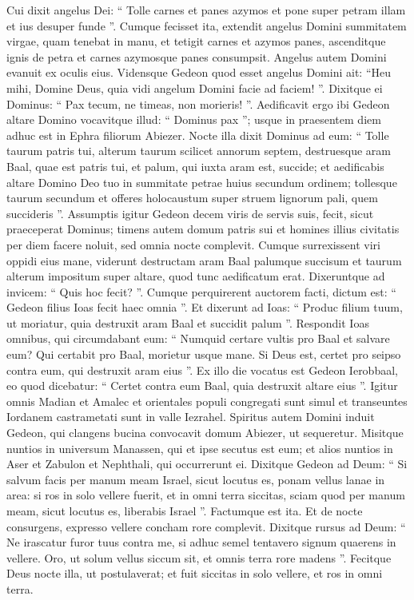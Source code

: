 \begin{biblechapter}
\begin{biblechapter}
\begin{biblechapter}
\begin{biblechapter}
\begin{biblechapter}
\begin{biblechapter}
\verse Cui dixit angelus Dei: “ Tolle carnes et panes azymos et pone super petram illam et ius desuper funde ”. Cumque fecisset ita, 
\verse extendit angelus Domini summitatem virgae, quam tenebat in manu, et tetigit carnes et azymos panes, ascenditque ignis de petra et carnes azymosque panes consumpsit. Angelus autem Domini evanuit ex oculis eius. 
\verse Vidensque Gedeon quod esset angelus Domini ait: “Heu mihi, Domine Deus, quia vidi angelum Domini facie ad faciem! ”. 
\verse Dixitque ei Dominus: “ Pax tecum, ne timeas, non morieris! ”. 
\verse Aedificavit ergo ibi Gedeon altare Domino vocavitque illud: “ Dominus pax ”; usque in praesentem diem adhuc est in Ephra filiorum Abiezer.
 \verse Nocte illa dixit Dominus ad eum: “ Tolle taurum patris tui, alterum taurum scilicet annorum septem, destruesque aram Baal, quae est patris tui, et palum, qui iuxta aram est, succide; 
\verse et aedificabis altare Domino Deo tuo in summitate petrae huius secundum ordinem; tollesque taurum secundum et offeres holocaustum super struem lignorum pali, quem succideris ”. 
\verse Assumptis igitur Gedeon decem viris de servis suis, fecit, sicut praeceperat Dominus; timens autem domum patris sui et homines illius civitatis per diem facere noluit, sed omnia nocte complevit.
 \verse Cumque surrexissent viri oppidi eius mane, viderunt destructam aram Baal palumque succisum et taurum alterum impositum super altare, quod tunc aedificatum erat. 
\verse Dixeruntque ad invicem: “ Quis hoc fecit? ”. Cumque perquirerent auctorem facti, dictum est: “ Gedeon filius Ioas fecit haec omnia ”. 
\verse Et dixerunt ad Ioas: “ Produc filium tuum, ut moriatur, quia destruxit aram Baal et succidit palum ”. 
\verse Respondit Ioas omnibus, qui circumdabant eum: “ Numquid certare vultis pro Baal et salvare eum? Qui certabit pro Baal, morietur usque mane. Si Deus est, certet pro seipso contra eum, qui destruxit aram eius ”. 
\verse Ex illo die vocatus est Gedeon Ierobbaal, eo quod dicebatur: “ Certet contra eum Baal, quia destruxit altare eius ”.
 \verse Igitur omnis Madian et Amalec et orientales populi congregati sunt simul et transeuntes Iordanem castrametati sunt in valle Iezrahel. 
\verse Spiritus autem Domini induit Gedeon, qui clangens bucina convocavit domum Abiezer, ut sequeretur. 
\verse Misitque nuntios in universum Manassen, qui et ipse secutus est eum; et alios nuntios in Aser et Zabulon et Nephthali, qui occurrerunt ei.
 \verse Dixitque Gedeon ad Deum: “ Si salvum facis per manum meam Israel, sicut locutus es, 
\verse ponam vellus lanae in area: si ros in solo vellere fuerit, et in omni terra siccitas, sciam quod per manum meam, sicut locutus es, liberabis Israel ”. 
\verse Factumque est ita. Et de nocte consurgens, expresso vellere concham rore complevit. 
\verse Dixitque rursus ad Deum: “ Ne irascatur furor tuus contra me, si adhuc semel tentavero signum quaerens in vellere. Oro, ut solum vellus siccum sit, et omnis terra rore madens ”. 
\verse Fecitque Deus nocte illa, ut postulaverat; et fuit siccitas in solo vellere, et ros in omni terra.
 

\end{biblechapter}
\end{biblechapter}
\end{biblechapter}
\end{biblechapter}
\end{biblechapter}
\end{biblechapter}
